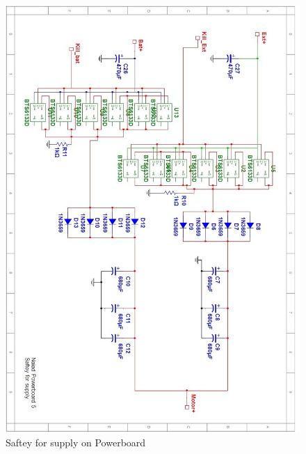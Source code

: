 \begin{figure}[!ht]
	\begin{center}
		\includegraphics[width=13.2cm]{./Images/Powerboard_Scematics/Saftey_supply.jpg}
		\caption{Saftey for supply on Powerboard}
	\end{center}
\end{figure}

